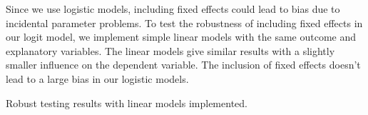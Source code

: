\documentclass[11pt]{article}
\begin{document}
Since we use logistic models, including fixed effects could lead to bias due to incidental parameter problems. To test the robustness of including fixed effects in our logit model, we implement simple linear models with the same outcome and explanatory variables. The linear models give similar results with a slightly smaller influence on the dependent variable. The inclusion of fixed effects doesn't lead to a large bias in our logistic models.

\begin{table}
\centering
\renewcommand{\arraystretch}{1.5}
\resizebox{\columnwidth}{!}{%

%
}
\caption{Robust testing results with linear models implemented.}
\label{t:reg_robust_linear}
\end{table}



\clearpage



\end{document}
